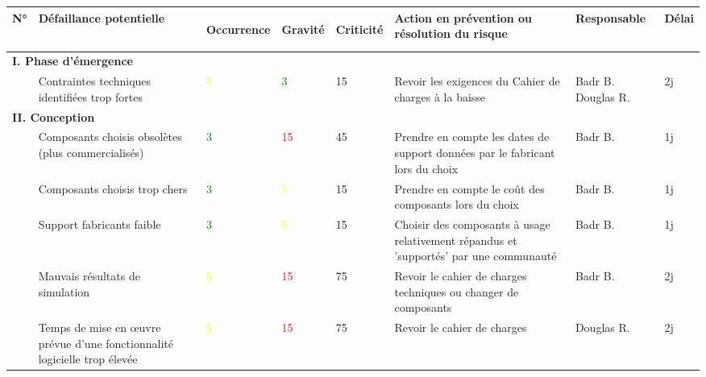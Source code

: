 \begin{sidewaystable}[H]
  \centering
  \begingroup{}
  \def\tabularxcolumn#1{m{#1}}
  
    \begin{tabularx}{\textwidth}{|p{1cm}|X|p{0.5cm}|p{0.5cm}|p{0.5cm}|X|p{2cm}|p{1cm}|}
    \hline
    \rowcolor[HTML]{ACCCEA} 
    N°    & Défaillance potentielle & \begin{sideways}Occurrence\end{sideways} & \begin{sideways}Gravité\end{sideways} & \begin{sideways}Criticité\end{sideways} & Action en prévention ou résolution du risque & Responsable & Délai \\ 
    \hline
    \multicolumn{8}{|l|}{\textbf{I. Phase d'émergence}} \\ \hline
          & Contraintes techniques identifiées trop fortes & \textcolor{yellow}{5}     & \textcolor{green}{3}     & 15      & Revoir les exigences du Cahier de charges à la baisse & Badr B.
Douglas R. & 2j \\ \hline
	
    \multicolumn{8}{|l|}{\textbf{II. Conception}} \\ \hline
          & Composants choisis obsolètes
(plus commercialisés) & \textcolor{green}{3} & \textcolor{red}{15}    & 45      & Prendre en compte les dates de
support données par le fabricant lors du choix & Badr B. & 1j \\ \hline
          & Composants choisis trop chers & \textcolor{green}{3}     & \textcolor{yellow}{5}     & 15      & Prendre en compte le coût des composants lors du choix & Badr B. & 1j \\ \hline
          & Support fabricants faible & \textcolor{green}{3}     & \textcolor{yellow}{5}     &  15     & Choisir des composants à usage relativement
répandus et 'supportés' par une communauté & Badr B. & 1j \\ \hline
          & Mauvais résultats de simulation & \textcolor{yellow}{5}     & \textcolor{red}{15}    & 75      & Revoir le cahier de charges techniques
ou changer de composants & Badr B. & 2j \\ \hline

          & Temps de mise en œuvre prévue d'une fonctionnalité logicielle trop élevée & \textcolor{yellow}{5}     & \textcolor{red}{15}    & 75      & Revoir le cahier de charges & Douglas R. & 2j \\ \hline
    

\end{tabularx}
\end{sidewaystable}
